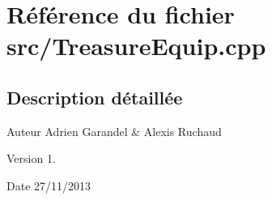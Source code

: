 \section{Référence du fichier src/\-Treasure\-Equip.cpp}
\label{_treasure_equip_8cpp}


\subsection{Description détaillée}
\begin{DoxyAuthor}{Auteur}
Adrien Garandel \& Alexis Ruchaud 
\end{DoxyAuthor}
\begin{DoxyVersion}{Version}
1. 
\end{DoxyVersion}
\begin{DoxyDate}{Date}
27/11/2013 
\end{DoxyDate}
